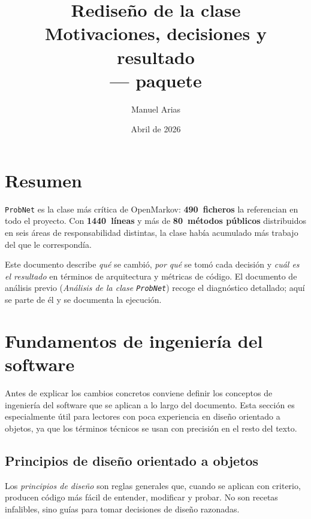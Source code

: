 \documentclass[11pt,a4paper]{article}
\title{Redise\~no de la clase \code{ProbNet}\\
       \large Motivaciones, decisiones y resultado\\[4pt]
       \normalsize \code{org.openmarkov.core} --- paquete \code{model.network}}
\author{Manuel Arias}
\date{Abril de 2026}
\newcommand{\code}[1]{\texttt{#1}}
\begin{document}
\maketitle
\tableofcontents
\newpage

\section*{Resumen}

\code{ProbNet} es la clase más crítica de OpenMarkov: \textbf{490~ficheros}
la referencian en todo el proyecto.  Con \textbf{1440~líneas} y más de
\textbf{80~métodos públicos} distribuidos en seis áreas de responsabilidad
distintas, la clase había acumulado más trabajo del que le correspondía.

Este documento describe \emph{qué} se cambió, \emph{por qué} se tomó
cada decisión y \emph{cuál es el resultado} en términos de arquitectura
y métricas de código.  El documento de análisis previo
(\emph{Análisis de la clase \code{ProbNet}}) recoge el diagnóstico
detallado; aquí se parte de él y se documenta la ejecución.

\section{Fundamentos de ingeniería del software}
\label{sec:fundamentos}

Antes de explicar los cambios concretos conviene definir los conceptos de
ingeniería del software que se aplican a lo largo del documento.  Esta
sección es especialmente útil para lectores con poca experiencia en diseño
orientado a objetos, ya que los términos técnicos se usan con precisión en
el resto del texto.

\subsection{Principios de diseño orientado a objetos}
\label{sec:fund-principios}

Los \emph{principios de diseño} son reglas generales que, cuando se
aplican con criterio, producen código más fácil de entender, modificar
y probar.  No son recetas infalibles, sino guías para tomar decisiones
de diseño razonadas.

\label{sec:fund-srp}
\end{document}
